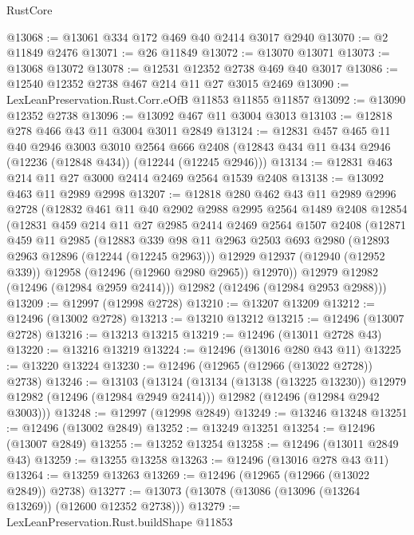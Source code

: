 \begin{lexlean}{RustCore}
\begin{coremodule}
@13068 := @13061 @334 @172 @469 @40 @2414 @3017 @2940
@13070 := @2 @11849 @2476
@13071 := @26 @11849
@13072 := @13070 @13071
@13073 := @13068 @13072
@13078 := @12531 @12352 @2738 @469 @40 @3017
@13086 := @12540 @12352 @2738 @467 @214 @11 @27 @3015 @2469
@13090 := LexLeanPreservation.Rust.Corr.eOfB @11853 @11855 @11857
@13092 := @13090 @12352 @2738
@13096 := @13092 @467 @11 @3004 @3013
@13103 := @12818 @278 @466 @43 @11 @3004 @3011 @2849
@13124 := @12831
    @457
    @465
    @11
    @40
    @2946
    @3003
    @3010
    @2564
    @666
    @2408
    (@12843 @434 @11 @434 @2946 (@12236 (@12848 @434)) (@12244 (@12245 @2946)))
@13134 := @12831 @463 @214 @11 @27 @3000 @2414 @2469 @2564 @1539 @2408
@13138 := @13092 @463 @11 @2989 @2998
@13207 := @12818
    @280
    @462
    @43
    @11
    @2989
    @2996
    @2728
    (@12832
      @461
      @11
      @40
      @2902
      @2988
      @2995
      @2564
      @1489
      @2408
      @12854
      (@12831
        @459
        @214
        @11
        @27
        @2985
        @2414
        @2469
        @2564
        @1507
        @2408
        (@12871
          @459
          @11
          @2985
          (@12883
            @339
            @98
            @11
            @2963
            @2503
            @693
            @2980
            (@12893 @2963 @12896 (@12244 (@12245 @2963)))
            @12929
            @12937
            (@12940 (@12952 @339))
            @12958
            (@12496 (@12960 @2980 @2965))
            @12970))
        @12979
        @12982
        (@12496 (@12984 @2959 @2414)))
      @12982
      (@12496 (@12984 @2953 @2988)))
@13209 := @12997 (@12998 @2728)
@13210 := @13207 @13209
@13212 := @12496 (@13002 @2728)
@13213 := @13210 @13212
@13215 := @12496 (@13007 @2728)
@13216 := @13213 @13215
@13219 := @12496 (@13011 @2728 @43)
@13220 := @13216 @13219
@13224 := @12496 (@13016 @280 @43 @11)
@13225 := @13220 @13224
@13230 := @12496 (@12965 (@12966 (@13022 @2728)) @2738)
@13246 := @13103
    (@13124
      (@13134 (@13138 (@13225 @13230)) @12979 @12982 (@12496 (@12984 @2949 @2414)))
      @12982
      (@12496 (@12984 @2942 @3003)))
@13248 := @12997 (@12998 @2849)
@13249 := @13246 @13248
@13251 := @12496 (@13002 @2849)
@13252 := @13249 @13251
@13254 := @12496 (@13007 @2849)
@13255 := @13252 @13254
@13258 := @12496 (@13011 @2849 @43)
@13259 := @13255 @13258
@13263 := @12496 (@13016 @278 @43 @11)
@13264 := @13259 @13263
@13269 := @12496 (@12965 (@12966 (@13022 @2849)) @2738)
@13277 := @13073 (@13078 (@13086 (@13096 (@13264 @13269)) (@12600 @12352 @2738)))
@13279 := LexLeanPreservation.Rust.buildShape @11853

\end{coremodule}
\end{lexlean}
